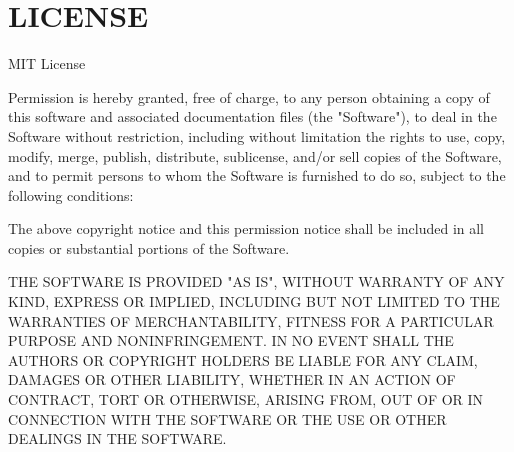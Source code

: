 \chapter{LICENSE }
\hypertarget{md__d_1_2_projects_2_raspberrypi__pico_2pico__freertos__final_2freertos__pico2_2pico__freertos_201bffa7c9a0e0274ba18edb3d2e5e664}{}\label{md__d_1_2_projects_2_raspberrypi__pico_2pico__freertos__final_2freertos__pico2_2pico__freertos_201bffa7c9a0e0274ba18edb3d2e5e664}
MIT License

Permission is hereby granted, free of charge, to any person obtaining a copy of this software and associated documentation files (the "{}\+Software"{}), to deal in the Software without restriction, including without limitation the rights to use, copy, modify, merge, publish, distribute, sublicense, and/or sell copies of the Software, and to permit persons to whom the Software is furnished to do so, subject to the following conditions\+:

The above copyright notice and this permission notice shall be included in all copies or substantial portions of the Software.

THE SOFTWARE IS PROVIDED "{}\+AS IS"{}, WITHOUT WARRANTY OF ANY KIND, EXPRESS OR IMPLIED, INCLUDING BUT NOT LIMITED TO THE WARRANTIES OF MERCHANTABILITY, FITNESS FOR A PARTICULAR PURPOSE AND NONINFRINGEMENT. IN NO EVENT SHALL THE AUTHORS OR COPYRIGHT HOLDERS BE LIABLE FOR ANY CLAIM, DAMAGES OR OTHER LIABILITY, WHETHER IN AN ACTION OF CONTRACT, TORT OR OTHERWISE, ARISING FROM, OUT OF OR IN CONNECTION WITH THE SOFTWARE OR THE USE OR OTHER DEALINGS IN THE SOFTWARE. 